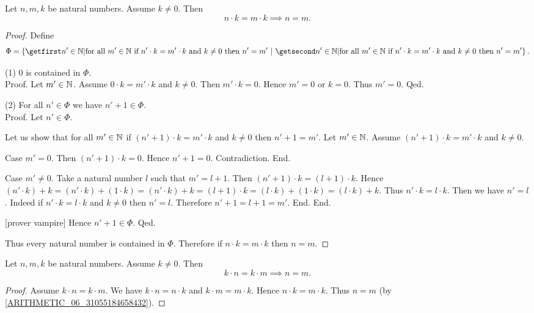 \documentclass[../arithmetic.tex]{subfiles}
\begin{document}
  \begin{forthel}
    \begin{proposition}
      Let $n, m, k$ be natural numbers.
      Assume $k \neq 0$.
      Then \[ n \cdot k = m \cdot k \implies n = m. \]
    \end{proposition}
    \begin{proof}
      Define \[ \Phi = \class{n' \in \Nat | \text{for all $m' \in \Nat$ if
      $n' \cdot k = m' \cdot k$ and $k \neq 0$ then $n' = m'$}}. \]

      (1) $0$ is contained in $\Phi$. \\
      Proof.
        Let $m' \in \mathbb{N}$.
        Assume $0 \cdot k = m' \cdot k$ and $k \neq 0$.
        Then $m' \cdot k = 0$.
        Hence $m' = 0$ or $k = 0$.
        Thus $m' = 0$.
      Qed.

      (2) For all $n' \in \Phi$ we have $n' + 1 \in \Phi$. \\
      Proof.
        Let $n' \in \Phi$.

        Let us show that for all $m' \in \mathbb{N}$ if $(n' + 1) \cdot k =
        m' \cdot k$ and $k \neq 0$ then $n' + 1 = m'$.
          Let $m' \in \mathbb{N}$.
          Assume $(n' + 1) \cdot k = m' \cdot k$ and $k \neq 0$.

          Case $m' = 0$.
            Then $(n' + 1) \cdot k = 0$.
            Hence $n' + 1 = 0$.
            Contradiction.
          End.

          Case $m' \neq 0$.
            Take a natural number $l$ such that $m' = l + 1$.
            Then $(n' + 1) \cdot k = (l + 1) \cdot k$.
            Hence $(n' \cdot k) + k
              = (n' \cdot k) + (1 \cdot k)
              = (n' \cdot k) + k
              = (l + 1) \cdot k
              = (l \cdot k) + (1 \cdot k)
              = (l \cdot k) + k$.
            Thus $n' \cdot k = l \cdot k$.
            Then we have $n' = l$.
            Indeed if $n' \cdot k = l \cdot k$ and $k \neq 0$ then $n' = l$.
            Therefore $n' + 1 = l + 1 = m'$.
          End.
        End.

        [prover vampire]
        Hence $n' + 1 \in \Phi$.
      Qed.

      Thus every natural number is contained in $\Phi$.
      Therefore if $n \cdot k = m \cdot k$ then $n = m$.
    \end{proof}
  \end{forthel}

  \begin{forthel}
    \begin{corollary}
      Let $n, m, k$ be natural numbers.
      Assume $k \neq 0$.
      Then \[ k \cdot n = k \cdot m \implies n = m. \]
    \end{corollary}
    \begin{proof}
      Assume $k \cdot n = k \cdot m$.
      We have $k \cdot n = n \cdot k$ and $k \cdot m = m \cdot k$.
      Hence $n \cdot k = m \cdot k$.
      Thus $n = m$ (by \cref{ARITHMETIC_06_31055184658432}).
    \end{proof}
  \end{forthel}
\end{document}
